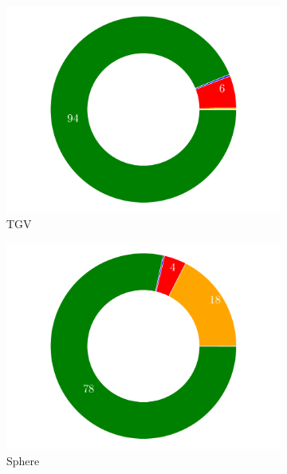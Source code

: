 \documentclass[final,3p,times]{elsarticle}
\begin{document}
\begin{figure}[!ht]
  \centering
  \begin{subfigure}[t]{0.33\linewidth}
      \centering
      \includegraphics[width=\linewidth]{img/tgv_profile.pdf}
      \caption{TGV}
  \end{subfigure}
  \begin{subfigure}[t]{0.33\linewidth}
    \centering
    \includegraphics[width=\linewidth]{img/sphere_profile.pdf}
    \caption{Sphere}
  \end{subfigure}
  \begin{subfigure}[t]{0.33\linewidth}
    \centering
\end{subfigure}
\end{figure}
\end{document}
